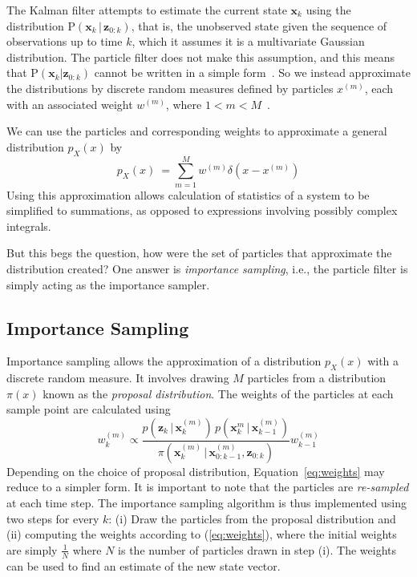 \documentclass[11pt]{article}
\begin{document}
The Kalman filter attempts to estimate the current state $\mathbf{x}_{k}$ using
the distribution $\textrm{P}(\mathbf{x}_{k}\,|\,\mathbf{z}_{0:k})$, that is, the
unobserved state given the sequence of observations up to time $k$, which
it assumes it is a multivariate Gaussian distribution. The particle filter does
not make this assumption, and this means that
$\textrm{P}(\mathbf{x}_{k}|\mathbf{z}_{0:k})$ cannot be written in a simple
form~{\cite{ref:1}}. So we instead approximate the distributions
by discrete random measures defined by particles $x^{(m)}$, each with an
associated weight $w^{(m)}$, where $1 < m < M$~{\cite{ref:2}}.

We can use the particles and corresponding weights to approximate a general
distribution $p_{X}(x)$ by
\begin{equation}
p_{X}(x) ~= \sum\limits_{m=1}^{M}{w^{(m)}\delta(x-x^{(m)})}
\end{equation}
Using this approximation allows calculation of statistics of a system to be
simplified to summations, as opposed to expressions involving possibly complex
integrals. 

But this begs the question, how were the set of particles that approximate the
distribution created? One answer is \emph{importance sampling}, i.e., the
particle filter is simply acting as the importance sampler.

\subsection{Importance Sampling}
Importance sampling allows the approximation of a distribution $p_{X}(x)$ with
a discrete random measure. It involves drawing $M$ particles from a
distribution $\pi(x)$ known as the \emph{proposal distribution}. The
weights of the particles at each sample point are calculated using
\begin{equation} \label{eq:weights}
w^{(m)}_{k} \propto
\frac
{p(\mathbf{z}_{k}\,|\,\mathbf{x}^{(m)}_{k})\,p(\mathbf{x}^{m}_{k}\,|\,\mathbf{x}
^ {(m)}_{ k-1})}{ \pi(\mathbf{x}^{(m)} _k\,|\,\mathbf{x}^{
(m)}_{0:k-1}, \mathbf{z}_{0:k})}w^{(m)}_{k-1}
\end{equation}
Depending on the choice of proposal distribution, Equation~\ref{eq:weights}
may reduce to a simpler form. It is important to note that the particles are
\emph{re-sampled} at each time step. The importance sampling algorithm is thus
implemented using two steps for every $k$: (i) Draw the particles from the
proposal distribution and (ii) computing the weights according to
(\ref{eq:weights}), where the initial weights are simply $\frac{1}{N}$ where $N$
is the number of particles drawn in step (i). The weights can be used to find an
estimate of the new state vector.
\end{document}
